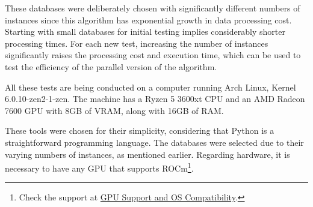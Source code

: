 These databases were deliberately chosen with significantly different numbers of instances since this algorithm has exponential growth in data processing cost. Starting with small databases for initial testing implies considerably shorter processing times. For each new test, increasing the number of instances significantly raises the processing cost and execution time, which can be used to test the efficiency of the parallel version of the algorithm.

All these tests are being conducted on a computer running Arch Linux, Kernel 6.0.10-zen2-1-zen. The machine has a Ryzen 5 3600xt CPU and an AMD Radeon 7600 GPU with 8GB of VRAM, along with 16GB of RAM.

These tools were chosen for their simplicity, considering that Python is a straightforward programming language. The databases were selected due to their varying numbers of instances, as mentioned earlier. Regarding hardware, it is necessary to have any GPU that supports ROCm\footnote[2]{Check the support at \href{https://rocm.docs.amd.com/en/latest/release/gpu_os_support.html}{GPU Support and OS Compatibility}.}.
